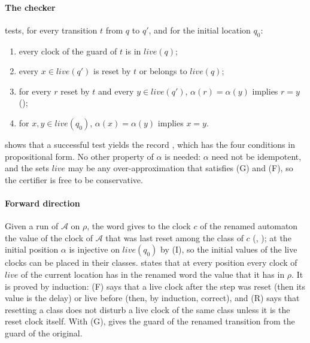 \paragraph{The checker}  tests, for every transition $t$ from $q$ to $q'$, and for the initial location $q_0$:
\begin{enumerate}[label=(\Alph*),leftmargin=*,itemsep=0pt]
  \item[(G)] every clock of the guard of $t$ is in $\mathit{live}(q)$;
  \item[(F)] every $x\in\mathit{live}(q')$ is reset by $t$ or belongs to $\mathit{live}(q)$;
  \item[(R)] for every $r$ reset by $t$ and every $y\in\mathit{live}(q')$, $\alpha(r)=\alpha(y)$ implies $r=y$ ();
  \item[(I)] for $x,y\in\mathit{live}(q_0)$, $\alpha(x)=\alpha(y)$ implies $x=y$.
\end{enumerate}
 shows that a successful test yields the record , which has the four conditions in propositional form. No other property of $\alpha$ is needed: $\alpha$ need not be idempotent, and the sets $\mathit{live}$ may be any over-approximation that satisfies (G) and (F), so the certifier is free to be conservative.

\paragraph{Forward direction} Given a run of $\mathcal A$ on $\rho$, the word  gives to the clock $c$ of the renamed automaton the value of the clock of $\mathcal A$ that was last reset among the class of $c$ (, ); at the initial position $\alpha$ is injective on $\mathit{live}(q_0)$ by (I), so the initial values of the live clocks can be placed in their classes.  states that at every position every clock of $\mathit{live}$ of the current location has in the renamed word the value that it has in $\rho$. It is proved by induction: (F) says that a live clock after the step was reset (then its value is the delay) or live before (then, by induction, correct), and (R) says that resetting a class does not disturb a live clock of the same class unless it is the reset clock itself. With (G),  gives the guard of the renamed transition from the guard of the original.

